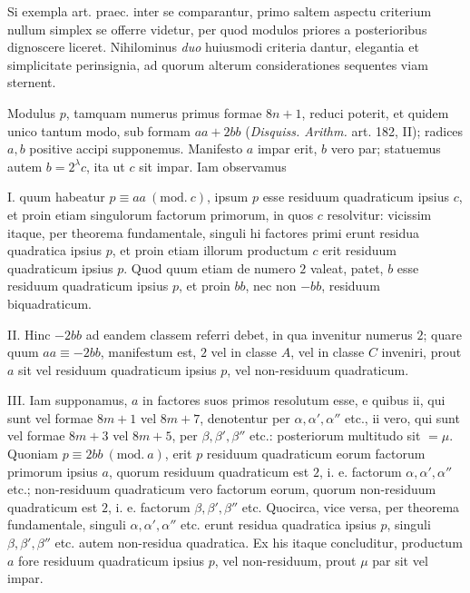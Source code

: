 %
Si exempla art. praec. inter se comparantur, primo saltem aspectu criterium nullum simplex se offerre videtur, per quod modulos priores a posterioribus dignoscere liceret. Nihilominus \emph{duo} huiusmodi criteria dantur, elegantia et simplicitate perinsignia, ad quorum alterum considerationes sequentes viam sternent.

Modulus $p$, tamquam numerus primus formae $8n+1$, reduci poterit, et quidem unico tantum modo, sub formam $aa+2bb$ (\emph{Disquiss. Arithm.} art. 182, II); radices $a,b$ positive accipi supponemus. Manifesto $a$ impar erit, $b$ vero par; statuemus autem $b=2^\lambda c$, ita ut $c$ sit impar. Iam observamus

I. quum habeatur $p\equiv aa\ (\mathrm{mod.}\ c)$, ipsum $p$ esse residuum quadraticum ipsius $c$, et proin etiam singulorum factorum primorum, in quos $c$ resolvitur: vicissim itaque, per theorema fundamentale, singuli hi factores primi erunt residua quadratica ipsius $p$, et proin etiam illorum productum $c$ erit residuum quadraticum ipsius $p$. Quod quum etiam de numero $2$ valeat, patet, $b$ esse residuum quadraticum ipsius $p$, et proin $bb$, nec non $-bb$, residuum biquadraticum.

II. Hinc $-2bb$ ad eandem classem referri debet, in qua invenitur numerus $2$; quare quum $aa\equiv-2bb$, manifestum est, $2$ vel in classe $A$, vel in classe $C$ inveniri, prout $a$ sit vel residuum quadraticum ipsius $p$, vel non-residuum quadraticum.

III. Iam supponamus, $a$ in factores suos primos resolutum esse, e quibus ii, qui sunt vel formae $8m+1$ vel $8m+7$, denotentur per $\alpha,\alpha',\alpha''$ etc., ii vero, qui sunt vel formae $8m+3$ vel $8m+5$, per $\beta,\beta',\beta''$ etc.: posteriorum multitudo sit $=\mu$. Quoniam $p\equiv2bb\ (\mathrm{mod.}\ a)$, erit $p$ residuum quadraticum eorum factorum primorum ipsius $a$, quorum residuum quadraticum est $2$, i. e. factorum $\alpha,\alpha',\alpha''$ etc.; non-residuum quadraticum vero factorum eorum, quorum non-residuum quadraticum est $2$, i. e. factorum $\beta,\beta',\beta''$ etc. Quocirca, vice versa, per theorema fundamentale, singuli $\alpha,\alpha',\alpha''$ etc. erunt residua quadratica ipsius $p$, singuli $\beta,\beta',\beta''$ etc. autem non-residua quadratica. Ex his itaque concluditur, productum $a$ fore residuum quadraticum ipsius $p$, vel non-residuum, prout $\mu$ par sit vel impar.


